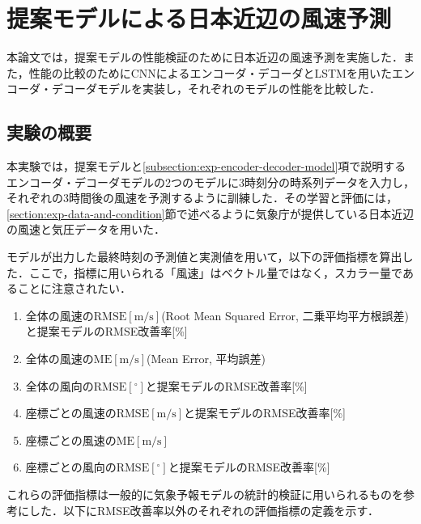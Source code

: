 \chapter{提案モデルによる日本近辺の風速予測\label{chap:experiments}}
本論文では，提案モデルの性能検証のために日本近辺の風速予測を実施した．また，性能の比較のためにCNNによるエンコーダ・デコーダとLSTMを用いたエンコーダ・デコーダモデルを実装し，それぞれのモデルの性能を比較した．

\section{実験の概要 \label{section:exp-overview}}
本実験では，提案モデルと\ref{subsection:exp-encoder-decoder-model}項で説明するエンコーダ・デコーダモデルの2つのモデルに3時刻分の時系列データを入力し，それぞれの3時間後の風速を予測するように訓練した．その学習と評価には，\ref{section:exp-data-and-condition}節で述べるように気象庁が提供している日本近辺の風速と気圧データを用いた．

モデルが出力した最終時刻の予測値と実測値を用いて，以下の評価指標を算出した．ここで，指標に用いられる「風速」はベクトル量ではなく，スカラー量であることに注意されたい．
% 
\begin{enumerate}
  \item 全体の風速の$\mathrm{RMSE[m/s]}$(Root Mean Squared Error, 二乗平均平方根誤差)と提案モデルのRMSE改善率[\%]
  \item 全体の風速の$\mathrm{ME[m/s]}$(Mean Error, 平均誤差)
  \item 全体の風向の$\mathrm{RMSE[^\circ]}$と提案モデルのRMSE改善率[\%]
  \item 座標ごとの風速の$\mathrm{RMSE[m/s]}$と提案モデルのRMSE改善率[\%]
  \item 座標ごとの風速の$\mathrm{ME[m/s]}$
  \item 座標ごとの風向の$\mathrm{RMSE[^\circ]}$と提案モデルのRMSE改善率[\%]
\end{enumerate}
これらの評価指標は一般的に気象予報モデルの統計的検証に用いられるものを参考にした\cite{Kishochou2018}．以下にRMSE改善率以外のそれぞれの評価指標の定義を示す．

